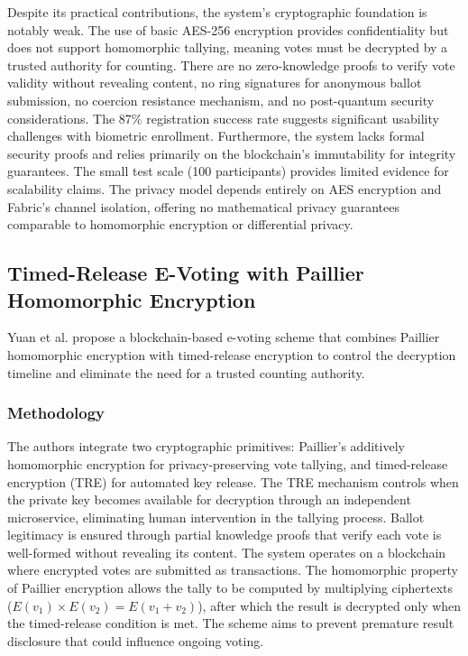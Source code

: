 Despite its practical contributions, the system's cryptographic foundation is notably weak. The use of basic AES-256 encryption provides confidentiality but does not support homomorphic tallying, meaning votes must be decrypted by a trusted authority for counting. There are no zero-knowledge proofs to verify vote validity without revealing content, no ring signatures for anonymous ballot submission, no coercion resistance mechanism, and no post-quantum security considerations. The 87\% registration success rate suggests significant usability challenges with biometric enrollment. Furthermore, the system lacks formal security proofs and relies primarily on the blockchain's immutability for integrity guarantees. The small test scale (100 participants) provides limited evidence for scalability claims. The privacy model depends entirely on AES encryption and Fabric's channel isolation, offering no mathematical privacy guarantees comparable to homomorphic encryption or differential privacy.

\subsection{Timed-Release E-Voting with Paillier Homomorphic Encryption}
\label{subsec:timed-release}

Yuan et al. \cite{paillier_timed} propose a blockchain-based e-voting scheme that combines Paillier homomorphic encryption with timed-release encryption to control the decryption timeline and eliminate the need for a trusted counting authority.

\subsubsection{Methodology}
\label{subsubsec:tr-method}

The authors integrate two cryptographic primitives: Paillier's additively homomorphic encryption for privacy-preserving vote tallying, and timed-release encryption (TRE) for automated key release. The TRE mechanism controls when the private key becomes available for decryption through an independent microservice, eliminating human intervention in the tallying process. Ballot legitimacy is ensured through partial knowledge proofs that verify each vote is well-formed without revealing its content. The system operates on a blockchain where encrypted votes are submitted as transactions. The homomorphic property of Paillier encryption allows the tally to be computed by multiplying ciphertexts ($E(v_1) \times E(v_2) = E(v_1 + v_2)$), after which the result is decrypted only when the timed-release condition is met. The scheme aims to prevent premature result disclosure that could influence ongoing voting.

